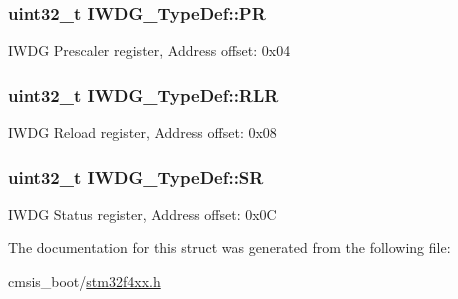 \subsubsection[{\texorpdfstring{PR}{PR}}]{ uint32\+\_\+t I\+W\+D\+G\+\_\+\+Type\+Def\+::\+PR}\hypertarget{struct_i_w_d_g___type_def_a5f2717885ff171e686e0347af9e6b68d}{}\label{struct_i_w_d_g___type_def_a5f2717885ff171e686e0347af9e6b68d}
I\+W\+DG Prescaler register, Address offset\+: 0x04 
\subsubsection[{\texorpdfstring{R\+LR}{RLR}}]{ uint32\+\_\+t I\+W\+D\+G\+\_\+\+Type\+Def\+::\+R\+LR}\hypertarget{struct_i_w_d_g___type_def_aa3703eaa40e447dcacc69c0827595532}{}\label{struct_i_w_d_g___type_def_aa3703eaa40e447dcacc69c0827595532}
I\+W\+DG Reload register, Address offset\+: 0x08 
\subsubsection[{\texorpdfstring{SR}{SR}}]{ uint32\+\_\+t I\+W\+D\+G\+\_\+\+Type\+Def\+::\+SR}\hypertarget{struct_i_w_d_g___type_def_a9bbfbe921f2acfaf58251849bd0a511c}{}\label{struct_i_w_d_g___type_def_a9bbfbe921f2acfaf58251849bd0a511c}
I\+W\+DG Status register, Address offset\+: 0x0C 

The documentation for this struct was generated from the following file\+:\begin{DoxyCompactItemize}
\item 
cmsis\+\_\+boot/\hyperlink{stm32f4xx_8h}{stm32f4xx.\+h}\end{DoxyCompactItemize}
